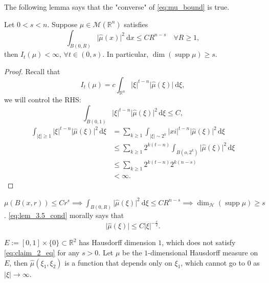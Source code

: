 The following lemma says that the "converse" of \eqref{eq:mu_bound} is true.
\begin{lemma}\label{lem:3.5}
Let $0<s<n$. Suppose $\mu \in \mathcal{M}(\mathbb{R}^{n})$ satisfies
\begin{equation}\label{eq:lem_3.5_cond}
\int _{B(0,R)}\lvert \hat{\mu}(x) \rvert ^{2}\ \mathrm{d}x\leq CR^{n-s}\quad\forall R\geq 1,
\end{equation}
then $I_{t}(\mu)<\infty$, $\forall t\in(0,s)$. In particular, $\operatorname{dim}(\operatorname{supp}\mu)\geq s$.
\end{lemma}
\begin{proof}
Recall that
$$
I_{t}(\mu)=c\int _{\mathbb{R}^{n}}\lvert \xi \rvert ^{t-n}\lvert \hat{\mu}(\xi) \rvert \ \mathrm{d}\xi,
$$
we will control the RHS:
$$
\int _{B(0,1)}\lvert \xi \rvert ^{t-n}\lvert \hat{\mu}(\xi) \rvert ^{2}\,\mathrm{d}\xi\leq C,
$$
$$
\begin{aligned}
\int _{\lvert \xi \rvert \geq {1}}\lvert \xi \rvert ^{t-n}\lvert \hat{\mu}(\xi) \rvert ^{2}\,\mathrm{d}\xi & =\sum _{k\geq{1}}\int _{\lvert \xi \rvert \sim 2^{k}}\lvert xi \rvert ^{t-n}\lvert \hat{\mu}(\xi) \rvert ^{2}\,\mathrm{d}\xi \\
 & \leq \sum _{k\geq 1} 2^{k(t-n)}\int _{B(o,2^{k})}\lvert \hat{\mu}(\xi) \rvert ^{2}\,\mathrm{d}\xi \\
 & \leq \sum _{k\geq 1}2^{k(t-n)}2^{k(n-s)} \\
 & < \infty.
\end{aligned}
$$
\end{proof}

\begin{remark}\label{rmk:hausdorff_dim}
$\mu(B(x,r))\leq Cr^{s}\implies \displaystyle \int _{B(0,R)}\lvert \hat{\mu}(\xi) \rvert^{2}\ \mathrm{d}\xi\leq CR^{n-s}\implies \operatorname{dim}_{\mathcal{H}}(\operatorname{supp}\mu)\geq s$. \eqref{eq:lem_3.5_cond} morally says that
\begin{equation}\label{eq:moral_decay}
\lvert \hat{\mu}(\xi) \rvert\leq C \lvert \xi \rvert^{-\frac{s}{2}}.
\end{equation}
\end{remark}

\begin{example}\label{ex:example_3}
$E:=[0,1]\times \{ 0 \}\subset \mathbb{R}^{2}$ has Hausdorff dimension $1$, 
which does not satisfy \eqref{eq:claim_2_eq} for any $s>0$. 
Let $\mu$ be the $1$-dimensional Hausdorff measure on $E$, 
then $\hat{\mu}(\xi_{1},\xi_{2})$ is a function that depends only on $\xi_{1}$, 
which cannot go to $0$ as $\lvert \xi \rvert \to \infty$.
\end{example}

